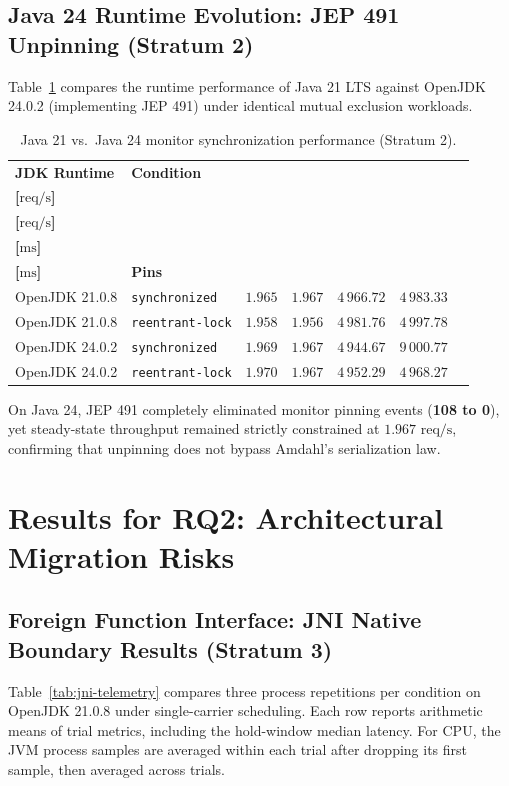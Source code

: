 \subsection{Java 24 Runtime Evolution: JEP 491 Unpinning (Stratum 2)}
Table~\ref{tab:jdk-evolution} compares the runtime performance of Java 21 LTS against OpenJDK 24.0.2 (implementing JEP 491) under identical mutual exclusion workloads.

\begin{table}[htbp]
  \centering
  \small
  \setlength{\tabcolsep}{3.5pt}
  \caption{Java 21 vs.\ Java 24 monitor synchronization performance (Stratum 2).}
  \label{tab:jdk-evolution}
  \begin{tabularx}{\textwidth}{@{}l l r r r r >{\raggedleft\arraybackslash}X@{}}
    \toprule
    \textbf{JDK Runtime} & \textbf{Condition} & \shortstack{\textbf{Whole}\\\textbf{[$\text{req/s}$]}} & \shortstack{\textbf{Steady}\\\textbf{[$\text{req/s}$]}} & \shortstack{\textbf{$p50$}\\\textbf{[$\text{ms}$]}} & \shortstack{\textbf{$p95$}\\\textbf{[$\text{ms}$]}} & \textbf{Pins} \\
    \midrule
    OpenJDK 21.0.8 & \texttt{synchronized} & $1.965$ & $1.967$ & $4\,966.72$ & $4\,983.33$ & 108 \\
    OpenJDK 21.0.8 & \texttt{reentrant-lock} & $1.958$ & $1.956$ & $4\,981.76$ & $4\,997.78$ & 0 \\
    OpenJDK 24.0.2 & \texttt{synchronized} & $1.969$ & $1.967$ & $4\,944.67$ & $9\,000.77$ & 0 \\
    OpenJDK 24.0.2 & \texttt{reentrant-lock} & $1.970$ & $1.967$ & $4\,952.29$ & $4\,968.27$ & 0 \\
    \bottomrule
  \end{tabularx}
\end{table}

On Java 24, JEP 491 completely eliminated monitor pinning events (\textbf{108 to 0}), yet steady-state throughput remained strictly constrained at \textbf{$1.967\text{ req/s}$}, confirming that unpinning does not bypass Amdahl's serialization law.

\section{Results for RQ2: Architectural Migration Risks}
\label{sec:results-rq2}

\subsection{Foreign Function Interface: JNI Native Boundary Results (Stratum 3)}
Table~\ref{tab:jni-telemetry} compares three process repetitions per condition on OpenJDK 21.0.8 under single-carrier scheduling. Each row reports arithmetic means of trial metrics, including the hold-window median latency. For CPU, the JVM process samples are averaged within each trial after dropping its first sample, then averaged across trials.

